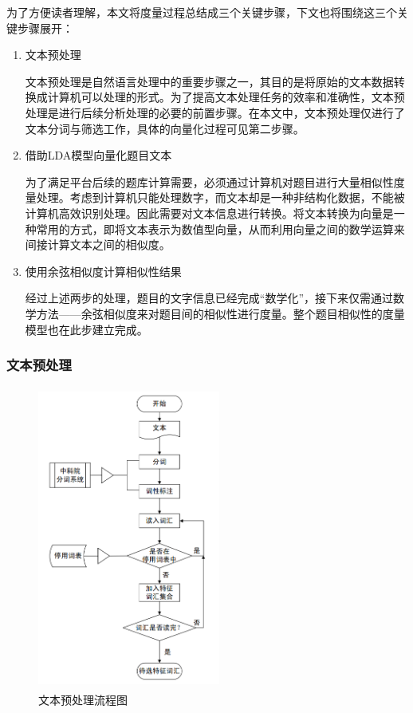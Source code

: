 为了方便读者理解，本文将度量过程总结成三个关键步骤，下文也将围绕这三个关键步骤展开：

\begin{enumerate}
    \item 文本预处理
    
    文本预处理是自然语言处理中的重要步骤之一，其目的是将原始的文本数据转换成计算机可以处理的形式。为了提高文本处理任务的效率和准确性，文本预处理是进行后续分析处理的必要的前置步骤。在本文中，文本预处理仅进行了文本分词与筛选工作，具体的向量化过程可见第二步骤。

    \item 借助LDA模型向量化题目文本
    
    为了满足平台后续的题库计算需要，必须通过计算机对题目进行大量相似性度量处理。考虑到计算机只能处理数字，而文本却是一种非结构化数据，不能被计算机高效识别处理。因此需要对文本信息进行转换。将文本转换为向量是一种常用的方式，即将文本表示为数值型向量，从而利用向量之间的数学运算来间接计算文本之间的相似度。

    \item 使用余弦相似度计算相似性结果
    
    经过上述两步的处理，题目的文字信息已经完成“数学化”，接下来仅需通过数学方法——余弦相似度来对题目间的相似性进行度量。整个题目相似性的度量模型也在此步建立完成。
\end{enumerate}

\subsubsection{文本预处理}

\begin{figure}[htbp]
    \centering
    \label{photo041944}
    \includegraphics[width=6cm,height=10cm]{res/Text preprocessing process.png}
    \caption{文本预处理流程图}
\end{figure} 

